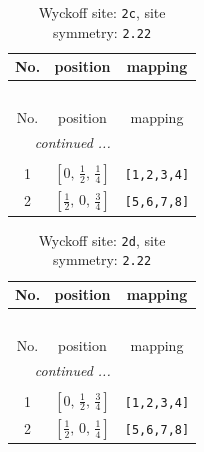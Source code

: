 \documentclass[fleqn,8pt]{jsarticle}
\begin{document}
\renewcommand{\arraystretch}{1.2}
\begin{longtable}{ccc}
\caption{Wyckoff site: {\tt 2c}, site symmetry: {\tt 2.22}}
 \\
 \hline \hline
No. & position & mapping \\ \hline \endfirsthead

\multicolumn{2}{l}{\tablename\ \thetable{}} \\
 \hline \hline
No. & position & mapping \\ \hline \endhead

 \hline \hline
\multicolumn{2}{r}{\footnotesize\it continued ...} \\ \endfoot

 \hline \hline
\multicolumn{2}{r}{} \\ \endlastfoot

1 & $\left[ 0,\, \frac{1}{2},\, \frac{1}{4} \right]$ & {\tt [1,2,3,4]} \\ \hline
2 & $\left[ \frac{1}{2},\, 0,\, \frac{3}{4} \right]$ & {\tt [5,6,7,8]} \\
\end{longtable}
\renewcommand{\arraystretch}{1.2}
\begin{longtable}{ccc}
\caption{Wyckoff site: {\tt 2d}, site symmetry: {\tt 2.22}}
 \\
 \hline \hline
No. & position & mapping \\ \hline \endfirsthead

\multicolumn{2}{l}{\tablename\ \thetable{}} \\
 \hline \hline
No. & position & mapping \\ \hline \endhead

 \hline \hline
\multicolumn{2}{r}{\footnotesize\it continued ...} \\ \endfoot

 \hline \hline
\multicolumn{2}{r}{} \\ \endlastfoot

1 & $\left[ 0,\, \frac{1}{2},\, \frac{3}{4} \right]$ & {\tt [1,2,3,4]} \\ \hline
2 & $\left[ \frac{1}{2},\, 0,\, \frac{1}{4} \right]$ & {\tt [5,6,7,8]} \\
\end{longtable}
\renewcommand{\arraystretch}{1.2}
\end{document}
